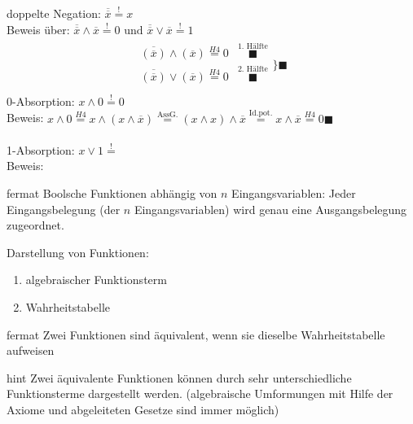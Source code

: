 \documentclass[10pt,a4paper]{scrartcl}
\begin{document}
\noindent
doppelte Negation: $ \overline{\overline{x}} \overset{!}{=} x $\\
Beweis über: $ \overline{\overline{x}} \wedge \overline{x} \overset{!}{=} 0 \text{ und }  \overline{\overline{x}} \vee \overline{x} \overset{!}{=} 1 $\\
\begin{align*}
\begin{array}{cc}
\overline{(\overline{x})} \wedge (\overline{x}) \overset{H4}{=} 0 & \overset{\text{1. Hälfte}}{\blacksquare}\\
\overline{(\overline{x})} \vee (\overline{x}) \overset{H4}{=} 0 & \overset{\text{2. Hälfte}}{\blacksquare}\\
\end{array}
\Bigg\} \blacksquare
\end{align*}
0-Absorption: $ x \wedge 0 \overset{!}{=} 0$\\
Beweis: $ x \wedge 0 \overset{H4}{=} x \wedge (x \wedge \overline{x})  \overset{\text{AssG.}}{=} (x \wedge x) \wedge \overline{x} \overset{\text{Id.pot.}}{=} x \wedge \overline{x} \overset{H4}{=} 0 \blacksquare$\\
\\
1-Absorption: $ x \vee 1 \overset{!}{=} $\\
Beweis: \\
\begin{Theorem}{}{fermat}
Boolsche Funktionen abhängig von $ n $ Eingangsvariablen: Jeder Eingangsbelegung (der $ n $ Eingangsvariablen) wird genau eine Ausgangsbelegung zugeordnet.
\end{Theorem}

Darstellung von Funktionen:
\begin{enumerate}
	\item algebraischer Funktionsterm
	\item Wahrheitstabelle
\end{enumerate}

\begin{Theorem}{}{fermat}
	Zwei Funktionen sind äquivalent, wenn sie dieselbe Wahrheitstabelle aufweisen
\end{Theorem}

\begin{Hint}{}{hint}
	Zwei äquivalente Funktionen können durch sehr unterschiedliche Funktionsterme dargestellt werden. (algebraische Umformungen mit Hilfe der Axiome und abgeleiteten Gesetze sind immer möglich)
\end{Hint}
\end{document}
